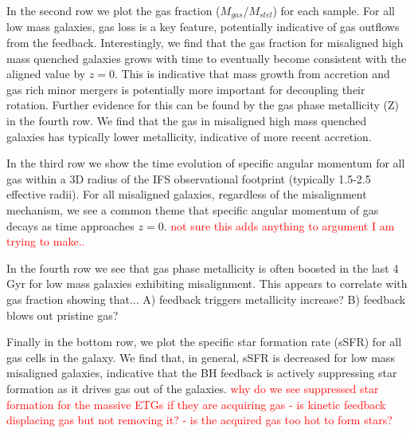 \documentclass[fleqn,usenatbib]{mnras}
\newcommand{\red}[1]{{\textcolor{red}{#1}}}
\begin{document}
In the second row we plot the gas fraction ($M_{gas}$/$M_{stel}$) for each sample. For all low mass galaxies, gas loss is a key feature, potentially indicative of gas outflows from the feedback. Interestingly, we find that the gas fraction for misaligned high mass quenched galaxies grows with time to eventually become consistent with the aligned value by $z=0$. This is indicative that mass growth from accretion and gas rich minor mergers is potentially more important for decoupling their rotation. Further evidence for this can be found by the gas phase metallicity (Z) in the fourth row. We find that the gas in misaligned high mass quenched galaxies has typically lower metallicity, indicative of more recent accretion.

In the third row we show the time evolution of specific angular momentum for all gas within a 3D radius of the IFS observational footprint (typically 1.5-2.5 effective radii). For all misaligned galaxies, regardless of the misalignment mechanism, we see a common theme that specific angular momentum of gas decays as time approaches $z=0$. \red{not sure this adds anything to argument I am trying to make..}

In the fourth row we see that gas phase metallicity is often boosted in the last 4 Gyr for low mass galaxies exhibiting misalignment. This appears to correlate with gas fraction showing that... A) feedback triggers metallicity increase? B) feedback blows out pristine gas?

Finally in the bottom row, we plot the specific star formation rate (sSFR) for all gas cells in the galaxy. We find that, in general, sSFR is decreased for low mass misaligned galaxies, indicative that the BH feedback is actively suppressing star formation as it drives gas out of the galaxies. \red{why do we see suppressed star formation for the massive ETGs if they are acquiring gas - is kinetic feedback displacing gas but not removing it? - is the acquired gas too hot to form stars?}
\end{document}
